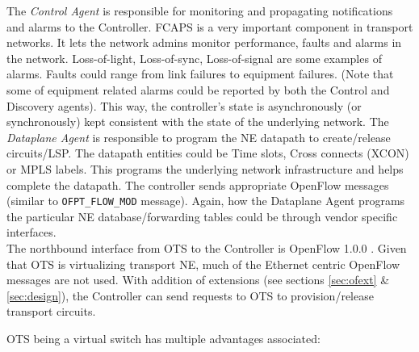 \documentclass{sig-alternate-10pt}
\begin{document}
	The \textit{Control Agent} is responsible for monitoring and propagating notifications and alarms to the
	Controller. FCAPS is a very important component in transport networks. It lets the network admins monitor
	performance, faults and alarms in the network. Loss-of-light, Loss-of-sync, Loss-of-signal are some
	examples of alarms. Faults could range from link failures to equipment failures. (Note that some of
	equipment related alarms could be reported by both the Control and Discovery agents). This way, the
	controller's state is asynchronously (or synchronously) kept consistent with the state of the underlying
	network. The \textit{Dataplane Agent} is responsible to program the NE datapath to create/release
	circuits/LSP. The datapath entities could be Time slots, Cross connects (XCON) or MPLS labels. This
	programs the underlying network infrastructure and helps complete the datapath. The controller sends
	appropriate OpenFlow messages (similar to \texttt{OFPT\_FLOW\_MOD} message). Again, how the Dataplane
	Agent programs the particular NE database/forwarding tables could be through vendor specific interfaces. \\
	
	The northbound interface from OTS to the Controller is OpenFlow 1.0.0 \cite{OF1.0}. Given that OTS is
	virtualizing transport NE, much of the Ethernet centric OpenFlow messages are not used. With addition of
	extensions (see sections \ref{sec:ofext} \& \ref{sec:design}), the Controller can send requests to OTS
	to provision/release transport circuits.
	
	OTS being a virtual switch has multiple advantages associated:
\end{document}
